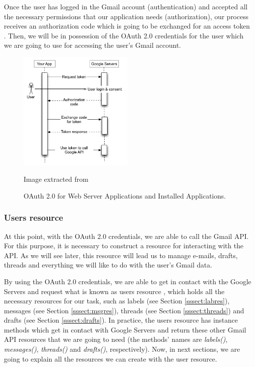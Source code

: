 Once the user has logged in the Gmail account (authentication) and accepted all the necessary permissions that our application needs (authorization), our process receives an authorization code which is going to be exchanged for an access token \citep{oauth-exchange}. Then, we will be in possession of the OAuth 2.0 credentials for the user \citep{oauth2.credentials} which we are going to use for accessing the user's Gmail account.

\begin{figure}[h]
	\centering%
	\includegraphics[width = 0.5\textwidth]{Imagenes/Bitmap/webflow.png}%
	\caption{OAuth 2.0 for Web Server Applications and Installed Applications.}%
	Image extracted from \cite{oauthforgoogle}
	\label{fig:oauth}
\end{figure}

\subsubsection{Users resource}\label{sssect:usersres}
At this point, with the OAuth 2.0 credentials, we are able to call the Gmail API. For this purpose, it is necessary to construct a resource \citep[/v1/reference]{gmailAPI} for interacting with the API. As we will see later, this resource will lead us to manage e-mails, drafts, threads and everything we will like to do with the user's Gmail data.

By using the OAuth 2.0 credentials, we are able to get in contact with the Google Servers and request what is known as users resource \citep[/v1/reference/users]{gmailAPI}, which holds all the necessary resources for our task, such as labels (see Section \ref{sssect:labres}), messages (see Section \ref{sssect:msgres}), threads (see Section \ref{sssect:threads}) and drafts (see Section \ref{sssect:drafts}). In practice, the users resource has instance methods which get in contact with Google Servers and return these other Gmail API resources that we are going to need (the methods' names are \textit{labels()}, \textit{messages()}, \textit{threads()} and \textit{drafts()}, respectively). Now, in next sections, we are going to explain all the resources we can create with the user resource.

